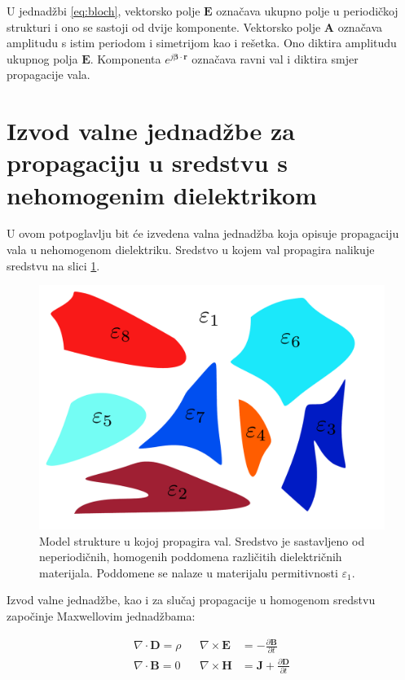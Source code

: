 \documentclass[utf8, seminar, numeric]{fer}
\begin{document}
U jednadžbi \ref{eq:bloch}, vektorsko polje $\mathbf{E}$ označava ukupno polje
u periodičkoj strukturi i ono se sastoji od dvije komponente. Vektorsko polje
$\mathbf{A}$ označava amplitudu s istim periodom i simetrijom kao i rešetka.
Ono diktira amplitudu ukupnog polja $\mathbf{E}$.
Komponenta ${e^{j {\bm{\beta}} \cdot \mathbf{r}}}$ označava ravni val i diktira
smjer propagacije vala.




\section{Izvod valne jednadžbe za propagaciju u sredstvu s nehomogenim dielektrikom}

U ovom potpoglavlju bit će izvedena valna jednadžba koja opisuje propagaciju
vala u nehomogenom dielektriku. Sredstvo u kojem val propagira nalikuje sredstvu
na slici \ref{fig:structure}.

\begin{figure}[ht]
	\centering
	\includegraphics[width = 0.8\linewidth]{./images/pdf/structure-model.pdf}
	\caption{Model strukture u kojoj propagira val. Sredstvo je sastavljeno od
	neperiodičnih, homogenih poddomena različitih dielektričnih materijala.
	Poddomene se nalaze u materijalu permitivnosti $\varepsilon_1$.}
	\label{fig:structure}
\end{figure}

\FloatBarrier

Izvod valne jednadžbe, kao i za slučaj propagacije u homogenom sredstvu započinje
Maxwellovim jednadžbama:

\begin{align} \label{eq:maxwell1}
	\nabla \cdot \mathbf{D} = \rho &&
	\nabla \times \mathbf{E} &=
		- \frac{\partial \mathbf{B}}{\partial t}  \nonumber \\
	\nabla \cdot \mathbf{B} = 0 &&
	\nabla \times \mathbf{H} &=
		\mathbf{J} + \frac{\partial \mathbf{D}}{\partial t}
\end{align}
\end{document}
